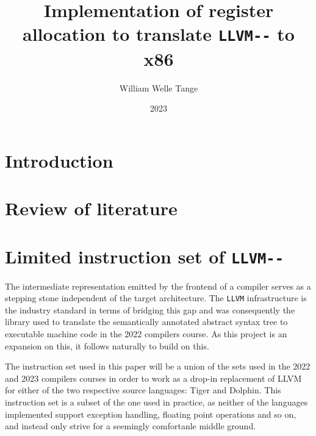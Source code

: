 \documentclass{article}
\title{Implementation of register allocation to translate \lstinline!LLVM--! to x86}
\author{William Welle Tange}
\date{2023}
\begin{document}
\maketitle

\section{Introduction}

\section{Review of literature}


%
%
%    
%
%    
%
%
%
%
%
%
%
%
%
%
%
%
%
    

\section{Limited instruction set of \lstinline!LLVM--!}

The intermediate representation emitted by the frontend of a compiler serves as a stepping stone independent of the target architecture. The \lstinline!LLVM! infrastructure is the industry standard in terms of bridging this gap and was consequently the library used to translate the semantically annotated abstract syntax tree to executable machine code in the 2022 compilers course. As this project is an expansion on this, it follows naturally to build on this. 

The instruction set used in this paper will be a union of the sets used in the 2022 and 2023 compilers courses in order to work as a drop-in replacement of LLVM for either of the two respective source languages:  Tiger and Dolphin. This instruction set is a subset of the one used in practice, as neither of the languages implemented support exception handling, floating point operations and so on, and instead only strive for a seemingly comfortanle middle ground.
\end{document}
